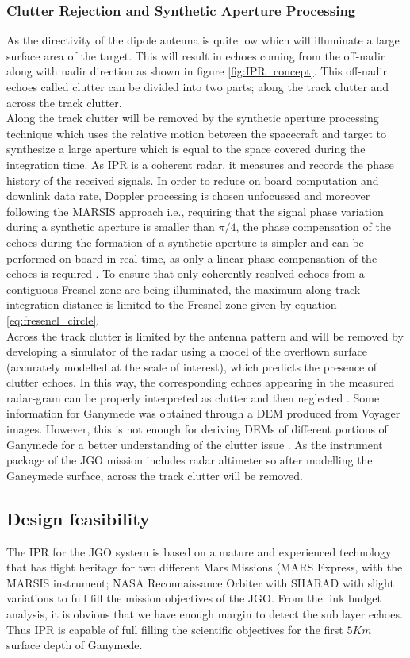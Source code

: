 \subsubsection{Clutter Rejection and Synthetic Aperture Processing}
\label{SAR}
As the directivity of the dipole antenna is quite low which will illuminate a large surface area of the target. This will result in echoes coming from the off-nadir along with nadir direction as shown in figure \ref{fig:IPR_concept}. This off-nadir echoes called clutter can be divided into two parts; along the track clutter and across the track clutter.\\
%
Along the track clutter will be removed by the synthetic aperture processing technique which uses the relative motion between the spacecraft and target to synthesize a large aperture which is equal to the space covered during the integration time. As \ac{IPR} is a coherent radar, it measures and records the phase history of the received signals. In order to reduce on board computation and downlink data rate, Doppler processing is chosen unfocussed and moreover following the \ac{MARSIS} approach i.e., requiring that the signal phase variation during a synthetic aperture is smaller than $\pi/4$, the phase compensation of the echoes during the formation of a synthetic aperture is simpler and can be performed on board in real time, as only a linear phase compensation of the echoes is required \cite{Gany_SRS}. To ensure that only coherently resolved echoes from a contiguous Fresnel zone are being illuminated, the maximum along track integration distance is limited to the Fresnel zone given by equation \ref{eq:fresenel_circle}.
\\
Across the track clutter is limited by the antenna pattern and will be removed by developing a simulator of the radar using a model of the overflown surface (accurately modelled at the scale of interest), which predicts the presence of clutter echoes. In this way, the corresponding echoes appearing in the measured radar-gram can be properly interpreted as clutter and then neglected \cite{SHARAD}. Some information for Ganymede was obtained through a \ac{DEM} produced from Voyager images. However, this is not enough  for deriving \acp{DEM} of different portions of Ganymede for a better understanding of the clutter issue \cite{Gany_SRS}. As the instrument package of the \ac{JGO} mission includes radar altimeter so after modelling the Ganeymede surface, across the track clutter will be removed.
\subsection{Design feasibility}
The \ac{IPR} for the \ac{JGO} system is based on a mature and experienced technology that has flight heritage for two different Mars Missions (MARS Express, with the \ac{MARSIS} instrument; NASA Reconnaissance Orbiter with \ac{SHARAD} with slight variations to full fill  the mission objectives of the \ac{JGO}. From the link budget analysis, it is obvious that we have enough margin to detect the sub layer echoes.  Thus \ac{IPR} is capable of full filling the scientific objectives for the first $5 Km$ surface depth of Ganymede.